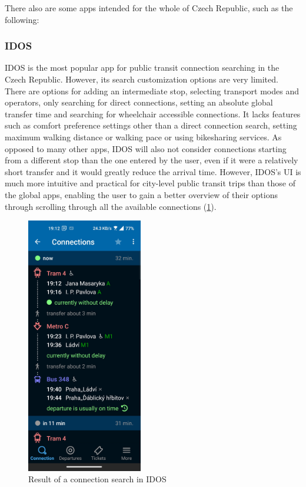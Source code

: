 There also are some apps intended for the whole of Czech Republic, such as the following:

\subsubsection{IDOS}

IDOS is the most popular app for public transit connection searching in the Czech Republic. However, its search customization options are very limited. There are options for adding an intermediate stop, selecting transport modes and operators, only searching for direct connections, setting an absolute global transfer time and searching for wheelchair accessible connections. It lacks features such as comfort preference settings other than a direct connection search, setting maximum walking distance or walking pace or using bikesharing services. As opposed to many other apps, IDOS will also not consider connections starting from a different stop than the one entered by the user, even if it were a relatively short transfer and it would greatly reduce the arrival time. However, IDOS's UI is much more intuitive and practical for city-level public transit trips than those of the global apps, enabling the user to gain a better overview of their options through scrolling through all the available connections (\cref{fig:idos}).

\begin{figure}[h!]
    \centering
    \includegraphics[width=0.45\textwidth]{img/screenshots/idos_result.jpg}
    \caption{Result of a connection search in IDOS}
    \label{fig:idos}
\end{figure}


